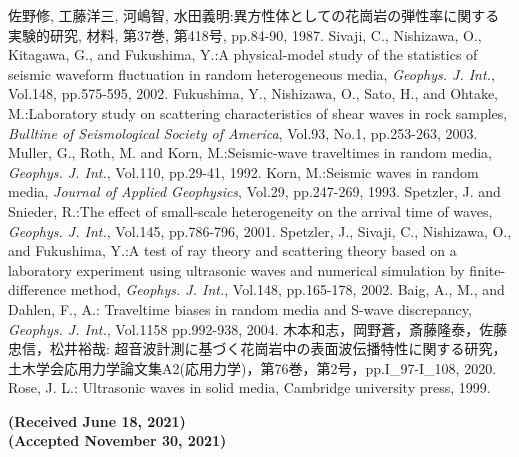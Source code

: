 \documentclass{jsce}
\begin{document}
\begin{thebibliography}{99}
\begin{spacing}{1.175}
{}
	佐野修, 工藤洋三, 河嶋智, 水田義明:異方性体としての花崗岩の弾性率に関する実験的研究, 
	材料, 第37巻, 第418号, pp.84-90, 1987.
	Sivaji, C., Nishizawa, O., Kitagawa, G., and Fukushima, Y.:A physical-model study of the statistics of seismic waveform fluctuation in random heterogeneous media, 
	{\it Geophys. J. Int.}, Vol.148, pp.575-595, 2002. 
	Fukushima, Y., Nishizawa, O., Sato, H., and Ohtake, M.:Laboratory study on scattering characteristics of shear waves 
	in rock samples, {\it Bulltine of Seismological Society of America}, Vol.93, No.1, pp.253-263, 2003.
	Muller, G., Roth, M. and Korn, M.:Seismic-wave traveltimes in random media,
	{\it Geophys. J. Int.}, Vol.110, pp.29-41, 1992. 
	Korn, M.:Seismic waves in random media, 
	{\it Journal of Applied Geophysics}, Vol.29, pp.247-269, 1993.
	Spetzler, J. and Snieder, R.:The effect of small-scale heterogeneity on the arrival time of waves, 
	{\it Geophys. J. Int.}, Vol.145, pp.786-796, 2001. 
	Spetzler, J., Sivaji, C., Nishizawa, O., and Fukushima, Y.:A test of ray theory and scattering theory based on
	a laboratory experiment using ultrasonic waves and numerical simulation by finite-difference method, 
	{\it Geophys. J. Int.}, Vol.148, pp.165-178, 2002. 
\lastpagecontrol[0.0cm]{19.0cm}
\newpage
{}
	Baig, A., M., and Dahlen, F., A.: Traveltime biases in random media and S-wave discrepancy, 
	{\it Geophys. J. Int.}, Vol.1158 pp.992-938, 2004. 
	木本和志，岡野蒼，斎藤隆泰，佐藤忠信，松井裕哉: 超音波計測に基づく花崗岩中の表面波伝播特性に関する研究，
	土木学会応用力学論文集A2(応用力学)，第76巻，第2号，pp.I\_97-I\_108, 2020.
	Rose, J. L.: Ultrasonic waves in solid media, Cambridge university press, 1999. 
\end{spacing}
\end{thebibliography}
\begin{flushright}
	\small
	\bf{ (Received June 18, 2021)\\
	(Accepted November 30, 2021)}
\end{flushright}
\end{document}
